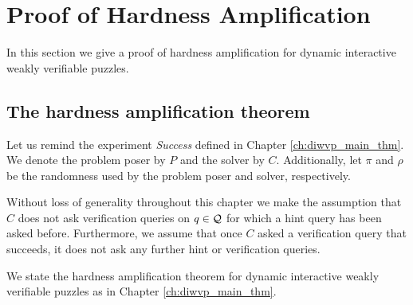 %
\section{Proof of Hardness Amplification}
In this section we give a proof of hardness amplification for dynamic interactive weakly verifiable puzzles.
\label{st:main_theorem}%
\subsection{The hardness amplification theorem}
\label{subst:main_theorem}%
Let us remind the experiment \textit{Success} defined in Chapter \ref{ch:diwvp_main_thm}.
We denote the problem poser by $P$ and the solver by $C$. Additionally, let $\pi$ and $\rho$ be the randomness used by
the problem poser and solver, respectively.

\success*

Without loss of generality throughout this chapter we make the assumption that $C$ does not ask verification queries on $q \in \mathcal{Q}$
for which a hint query has been asked before. Furthermore, we assume that once $C$ asked
a verification query that succeeds, it does not ask any further hint or verification queries.

We state the hardness amplification theorem for dynamic interactive weakly verifiable puzzles as in Chapter \ref{ch:diwvp_main_thm}.
\hardnessAmpfDiwvp*
%

